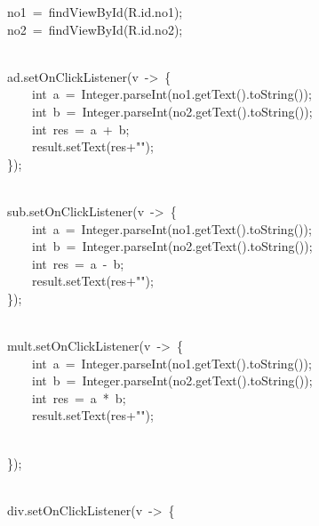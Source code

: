 {\ttfamily\small \ \ \ \ \ \ \ \ no1\ =\ findViewById(R.id.no1);} \\
{\ttfamily\small \ \ \ \ \ \ \ \ no2\ =\ findViewById(R.id.no2);} \\
\strut \\
{\ttfamily\small \ \ \ \ \ \ \ \ ad.setOnClickListener(v\ -\textgreater{}\ \{} \\
{\ttfamily\small \ \ \ \ \ \ \ \ \ \ \ \ int\ a\ =\ Integer.parseInt(no1.getText().toString());} \\
{\ttfamily\small \ \ \ \ \ \ \ \ \ \ \ \ int\ b\ =\ Integer.parseInt(no2.getText().toString());} \\
{\ttfamily\small \ \ \ \ \ \ \ \ \ \ \ \ int\ res\ =\ a\ +\ b;} \\
{\ttfamily\small \ \ \ \ \ \ \ \ \ \ \ \ result.setText(res+"");} \\
{\ttfamily\small \ \ \ \ \ \ \ \ \});} \\
\strut \\
{\ttfamily\small \ \ \ \ \ \ \ \ sub.setOnClickListener(v\ -\textgreater{}\ \{} \\
{\ttfamily\small \ \ \ \ \ \ \ \ \ \ \ \ int\ a\ =\ Integer.parseInt(no1.getText().toString());} \\
{\ttfamily\small \ \ \ \ \ \ \ \ \ \ \ \ int\ b\ =\ Integer.parseInt(no2.getText().toString());} \\
{\ttfamily\small \ \ \ \ \ \ \ \ \ \ \ \ int\ res\ =\ a\ -\ b;} \\
{\ttfamily\small \ \ \ \ \ \ \ \ \ \ \ \ result.setText(res+"");} \\
{\ttfamily\small \ \ \ \ \ \ \ \ \});} \\
\strut \\
{\ttfamily\small \ \ \ \ \ \ \ \ mult.setOnClickListener(v\ -\textgreater{}\ \{} \\
{\ttfamily\small \ \ \ \ \ \ \ \ \ \ \ \ int\ a\ =\ Integer.parseInt(no1.getText().toString());} \\
{\ttfamily\small \ \ \ \ \ \ \ \ \ \ \ \ int\ b\ =\ Integer.parseInt(no2.getText().toString());} \\
{\ttfamily\small \ \ \ \ \ \ \ \ \ \ \ \ int\ res\ =\ a\ *\ b;} \\
{\ttfamily\small \ \ \ \ \ \ \ \ \ \ \ \ result.setText(res+"");} \\
\strut \\
{\ttfamily\small \ \ \ \ \ \ \ \ \});} \\
\strut \\
{\ttfamily\small \ \ \ \ \ \ \ \ div.setOnClickListener(v\ -\textgreater{}\ \{} \\

